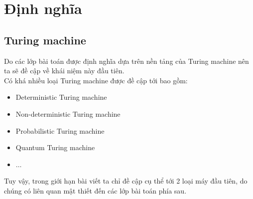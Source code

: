 \documentclass[a4paper 14pt]{extarticle}
\begin{document}
	\section{Định nghĩa}
		\subsection{Turing machine}
			Do các lớp bài toán được định nghĩa dựa trên nền tảng của Turing machine nên ta sẽ đề cập về khái niệm này đầu tiên.\\
			Có khá nhiều loại Turing machine được đề cập tới bao gồm:\\
			\begin{itemize}
				\item Deterministic Turing machine
				\item Non-deterministic Turing machine
				\item Probabilistic Turing machine
				\item Quantum Turing machine
				\item $\hdots$
			\end{itemize}
			Tuy vậy, trong giới hạn bài viết ta chỉ đề cập cụ thể tới 2 loại máy đầu tiên, do chúng có liên quan mật thiết đến các lớp bài toán phía sau.
\end{document}
